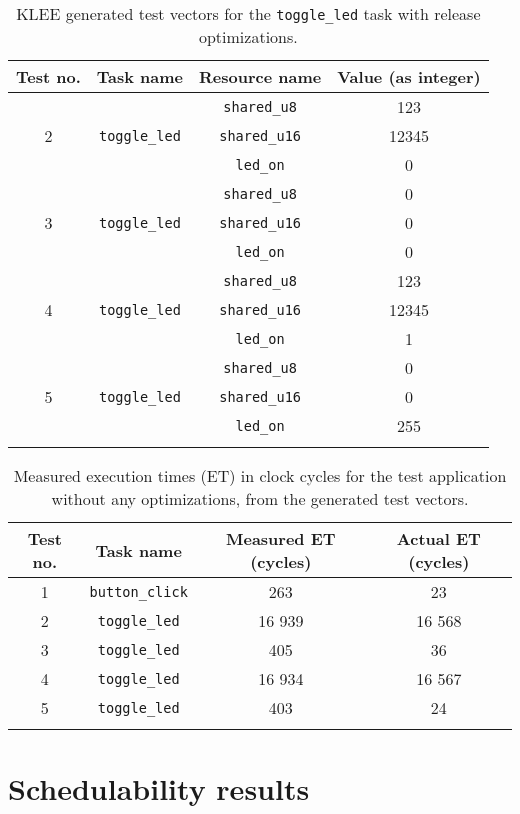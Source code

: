 \begin{longtable}{|c|c|c|c|}
\hline
Test no. & Task name & Resource name & Value (as integer) \\ \hline
\multirow{3}{*}{2} & \multirow{3}{*}{\texttt{toggle\_led}} & \texttt{shared\_u8}  & 123 \\ \cline{3-4} 
                   &                                       & \texttt{shared\_u16} & 12345 \\ \cline{3-4} 
                   &                                       & \texttt{led\_on}     & 0 \\ \hline
\multirow{3}{*}{3} & \multirow{3}{*}{\texttt{toggle\_led}} & \texttt{shared\_u8}  & 0 \\ \cline{3-4} 
                   &                                       & \texttt{shared\_u16} & 0 \\ \cline{3-4} 
                   &                                       & \texttt{led\_on}     & 0 \\ \hline
\multirow{3}{*}{4} & \multirow{3}{*}{\texttt{toggle\_led}} & \texttt{shared\_u8}  & 123 \\ \cline{3-4} 
                   &                                       & \texttt{shared\_u16} & 12345 \\ \cline{3-4} 
                   &                                       & \texttt{led\_on}     & 1 \\ \hline
\multirow{3}{*}{5} & \multirow{3}{*}{\texttt{toggle\_led}} & \texttt{shared\_u8}  & 0 \\ \cline{3-4} 
                   &                                       & \texttt{shared\_u16} & 0 \\ \cline{3-4} 
                   &                                       & \texttt{led\_on}     & 255 \\ \hline
\caption{KLEE generated test vectors for the \texttt{toggle\_led} task with release optimizations.}
\label{tab:evalreleaseteststoggle}
\end{longtable}

\begin{longtable}{|c | c | c | c|}
    \hline
    Test no. & Task name & Measured ET (cycles) & Actual ET (cycles) \\ [0.5ex]
    \hline
    1 & \texttt{button\_click} & 263 & 23 \\
    \hline
    2 & \texttt{toggle\_led} & 16 939 & 16 568 \\
    \hline
    3 & \texttt{toggle\_led} & 405 & 36 \\
    \hline
    4 & \texttt{toggle\_led} & 16 934 & 16 567 \\
    \hline
    5 & \texttt{toggle\_led} & 403 & 24 \\
    \hline
\caption{Measured execution times (ET) in clock cycles for the test application without any optimizations, from the generated test vectors.}
\label{tab:evalreleasemeasure}
\end{longtable}

\section{Schedulability results}
